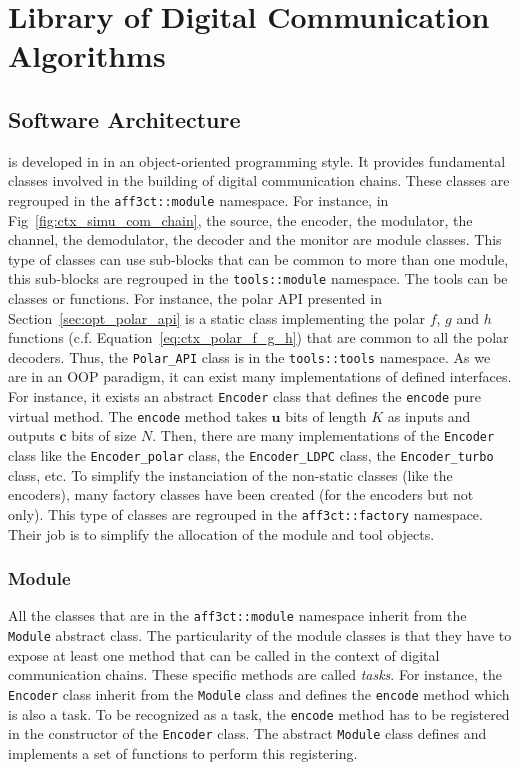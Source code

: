 \section{Library of Digital Communication Algorithms}

\subsection{Software Architecture}
\label{sec:aff3ct_archi}

\AFFECT is developed in \Cxx in an object-oriented programming style. It
provides fundamental classes involved in the building of digital communication
chains. These classes are regrouped in the \verb|aff3ct::module| namespace. For
instance, in Fig~\ref{fig:ctx_simu_com_chain}, the source, the encoder, the
modulator, the channel, the demodulator, the decoder and the monitor are module
classes. This type of classes can use sub-blocks that can be common to more than
one module, this sub-blocks are regrouped in the \verb|tools::module| namespace.
The tools can be classes or functions. For instance, the polar API presented in
Section~\ref{sec:opt_polar_api} is a static class implementing the polar $f$,
$g$ and $h$ functions (c.f. Equation~\ref{eq:ctx_polar_f_g_h}) that are common
to all the polar decoders. Thus, the \verb|Polar_API| class is in the
\verb|tools::tools| namespace. As we are in an OOP paradigm, it can exist many
implementations of defined interfaces. For instance, it exists an abstract
\verb|Encoder| class that defines the \verb|encode| pure virtual method. The
\verb|encode| method takes $\bm{u}$ bits of length $K$ as inputs and outputs
$\bm{c}$ bits of size $N$. Then, there are many implementations of the
\verb|Encoder| class like the \verb|Encoder_polar| class, the
\verb|Encoder_LDPC| class, the \verb|Encoder_turbo| class, etc. To simplify the
instanciation of the non-static classes (like the encoders), many factory
classes have been created (for the encoders but not only). This type of classes
are regrouped in the \verb|aff3ct::factory| namespace. Their job is to simplify
the allocation of the module and tool objects.

\subsubsection{Module}

All the classes that are in the \verb|aff3ct::module| namespace inherit from the
\verb|Module| abstract class. The particularity of the module classes is that
they have to expose at least one method that can be called in the context of
digital communication chains. These specific methods are called \emph{tasks}.
For instance, the \verb|Encoder| class inherit from the \verb|Module| class and
defines the \verb|encode| method which is also a task. To be recognized as a
task, the \verb|encode| method has to be registered in the constructor of the
\verb|Encoder| class. The abstract \verb|Module| class defines and implements a
set of functions to perform this registering.

